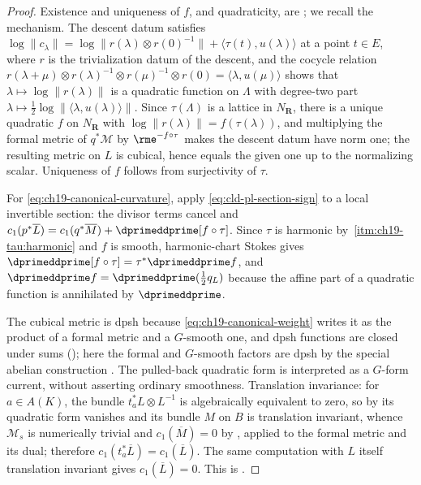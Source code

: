 \begin{proof}
Existence and uniqueness of $f$, and quadraticity, are
\cite[Proposition~19.2.5]{CLD25}; we recall the mechanism.  The descent
datum satisfies
$\log\|c_\lambda\|=\log\|r(\lambda)\otimes r(0)^{-1}\|
 +\langle\tau(t),u(\lambda)\rangle$ at a point $t\in E$, where $r$ is the
trivialization datum of the descent, and the cocycle relation
$r(\lambda+\mu)\otimes r(\lambda)^{-1}\otimes r(\mu)^{-1}\otimes r(0)
 =\langle\lambda,u(\mu)\rangle$ shows that
$\lambda\mapsto\log\|r(\lambda)\|$ is a quadratic function on $\Lambda$ with
degree-two part $\lambda\mapsto\tfrac12\log\|\langle\lambda,u(\lambda)\rangle\|$.
Since $\tau(\Lambda)$ is a lattice in $N_{\mathbf R}$, there is a unique
quadratic $f$ on $N_{\mathbf R}$ with $\log\|r(\lambda)\|=f(\tau(\lambda))$,
and multiplying the formal metric of $q^*\mathcal M$ by $\rme^{-f\circ\tau}$
makes the descent datum have norm one; the resulting metric on $L$ is
cubical, hence equals the given one up to the normalizing scalar.
Uniqueness of $f$ follows from surjectivity of $\tau$.

For \eqref{eq:ch19-canonical-curvature}, apply
\eqref{eq:cld-pl-section-sign} to a local invertible section: the divisor
terms cancel and
$c_1(p^*\overline L)=c_1(q^*\overline M)+\dprimeddprime[f\circ\tau]$.  Since
$\tau$ is harmonic by
\,\cref{itm:ch19-tau:harmonic} and $f$ is
smooth, harmonic-chart Stokes \cite[Corollary~7.8.8]{CLD25} gives
$\dprimeddprime[f\circ\tau]=\tau^*\dprimeddprime f$, and
$\dprimeddprime f=\dprimeddprime(\tfrac12q_L)$ because the affine part of a
quadratic function is annihilated by $\dprimeddprime$.

The cubical metric is dpsh because \eqref{eq:ch19-canonical-weight} writes
it as the product of a formal metric and a $G$-smooth one, and dpsh
functions are closed under sums (); here the
formal and $G$-smooth factors are dpsh by the special abelian construction
\cite[Corollary~19.2.6]{CLD25}.  The pulled-back quadratic form is
interpreted as a $G$-form current, without asserting ordinary smoothness.
Translation
invariance: for $a\in A(K)$, the bundle $t_a^*L\otimes L^{-1}$ is
algebraically equivalent to zero, so by \cite[Proposition~B.6.7]{CLD25} its
quadratic form vanishes and its bundle $M$ on $B$ is translation invariant,
whence $\mathcal M_s$ is numerically trivial and
$c_1(\overline M)=0$ by \cite[Corollary~18.8.8]{CLD25}, applied to the
formal metric and its dual; therefore
$c_1(t_a^*\overline L)=c_1(\overline L)$.  The same computation with
$L$ itself translation invariant gives $c_1(\overline L)=0$.  This is
\cite[Corollary~19.2.6]{CLD25}.
\end{proof}


